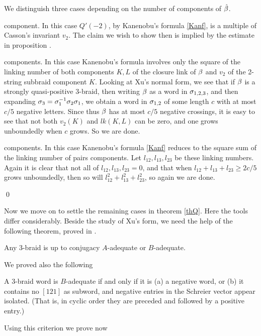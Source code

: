  We distinguish three
cases depending on the number of components of $\hat{\beta}$.

\begin{caselist}
 component. In this case $Q'(-2)$, by Kanenobu's formula
\eqref{Kanf},
is a multiple of Casson's invariant $v_2$. The claim we wish to 
show then is implied by the estimate in proposition .

 components. In this case Kanenobu's formula 
involves only the square of the linking number of both components 
$K,L$ of the closure link of $\beta$ and $v_2$ of the 2-string subbraid 
component $K$. Looking at Xu's normal form, we see that if $\beta$ is 
a strongly quasi-positive 3-braid, then writing $\beta$ as a word
in $\sigma_{1,2,3}$, and then expanding $\sigma_3=\sigma_1^{-1}\sigma_2\sigma_1$,
we obtain a word in $\sigma_{1,2}$ of some length $c$ with at most 
$c/5$ negative letters. Since thus $\beta$ has at most $c/5$ negative
crossings, it is easy to see that not both $v_2(K)$ and $lk(K,L)$
can be zero, and one grows unboundedly when $c$ grows. So we are done.

 components. In this case Kanenobu's formula \eqref{Kanf} 
reduces to the square sum of the linking number of pairs components.
Let $l_{12},l_{13},l_{23}$ be these linking numbers. Again it is 
clear that not all of $l_{12},l_{13},l_{23}=0$, and that when 
$l_{12}+l_{13}+l_{23}\ge 2c/5$ grows unboundedly, then so will
$l_{12}^2+l_{13}^2+l_{23}^2$, so again we are done.
\end{caselist}
\qed

Now we move on to settle the remaining cases in theorem \ref{thQ}.
Here the tools differ considerably. Beside the study of Xu's form,
we need the help of the following theorem, proved in \cite{ntriv}.

\begin{theorem}\label{thq}
Any $3$-braid is up to conjugacy $A$-adequate or $B$-adequate.
\end{theorem}

We proved also the following

\begin{theorem}
A $3$-braid word is $B$-adequate if and only if it is (a) a
negative word, or (b) it contains no $[121]$ as subword, and negative
entries in the Schreier vector appear isolated. (That is, in
cyclic order they are preceded and followed by a positive entry.)
\end{theorem}

Using this criterion we prove now

